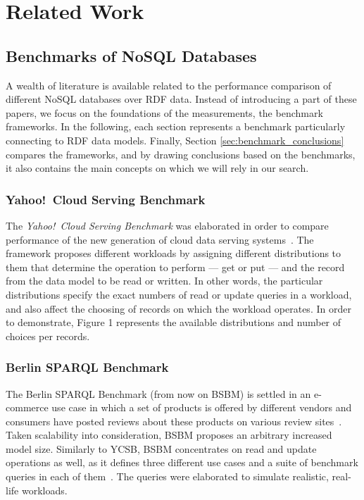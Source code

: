 \chapter{Related Work}


\section{Benchmarks of NoSQL Databases}

A wealth of literature is available related to the performance comparison of different NoSQL databases over RDF data. Instead of introducing a part of these papers, we focus on the foundations of the measurements, the benchmark frameworks. In the following, each section represents a benchmark particularly connecting to RDF data models. Finally, Section \ref{sec:benchmark_conclusions} compares the frameworks, and by drawing conclusions based on the benchmarks, it also contains the main concepts on which we will rely in our search.

\subsection{Yahoo!~Cloud Serving Benchmark}

The \textit{Yahoo!~Cloud Serving Benchmark} was elaborated in order to compare performance of the new generation
of cloud data serving systems~\cite{ycsb}. The framework proposes different workloads by assigning
different distributions to them that determine the operation to perform --- get or put --- and the record from the data model to be read or written. In other words, the particular distributions specify the exact numbers of read or update queries in a workload, and also affect the choosing of records on which the workload operates. In order to demonstrate, Figure 1 %
represents the available distributions and number of choices per records.

\subsection{Berlin SPARQL Benchmark}

The Berlin SPARQL Benchmark (from now on BSBM) is settled in an e-commerce use case in which a set of products
is offered by different vendors and consumers have posted reviews about these products on various review sites~\cite{berlin}. Taken scalability into consideration, BSBM proposes an arbitrary increased model size. Similarly to YCSB, BSBM concentrates on read and update operations as well, as it defines three different use cases and a suite of benchmark queries in each of them~\cite{berlin_specification}. The queries were elaborated to simulate realistic, real-life workloads.

